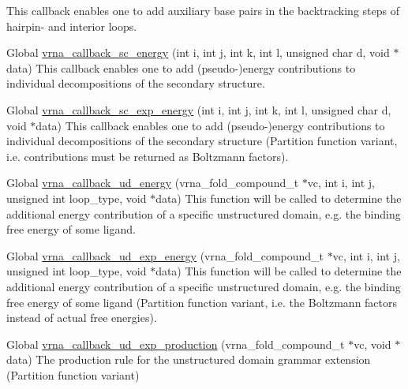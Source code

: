 \begin{DoxyRefList}
%
 This callback enables one to add auxiliary base pairs in the backtracking steps of hairpin-\/ and interior loops.  
\item[Global \mbox{\hyperlink{group__soft__constraints_ga88a266695d9e25cc12114dceb7b4565e}{vrna\+\_\+callback\+\_\+sc\+\_\+energy}} (int i, int j, int k, int l, unsigned char d, void $\ast$data)]\label{callbacks__callbacks000014}%
%
 This callback enables one to add (pseudo-\/)energy contributions to individual decompositions of the secondary structure.  
\item[Global \mbox{\hyperlink{group__soft__constraints_ga4099978d410513edeeff8f3db13144c5}{vrna\+\_\+callback\+\_\+sc\+\_\+exp\+\_\+energy}} (int i, int j, int k, int l, unsigned char d, void $\ast$data)]\label{callbacks__callbacks000015}%
%
 This callback enables one to add (pseudo-\/)energy contributions to individual decompositions of the secondary structure (Partition function variant, i.\+e. contributions must be returned as Boltzmann factors).  
\item[Global \mbox{\hyperlink{group__domains__up_ga75825c57d0bfde4ae4f95c044260c5c3}{vrna\+\_\+callback\+\_\+ud\+\_\+energy}} (vrna\+\_\+fold\+\_\+compound\+\_\+t $\ast$vc, int i, int j, unsigned int loop\+\_\+type, void $\ast$data)]\label{callbacks__callbacks000007}%
%
 This function will be called to determine the additional energy contribution of a specific unstructured domain, e.\+g. the binding free energy of some ligand.  
\item[Global \mbox{\hyperlink{group__domains__up_ga861706f257ba993753464b823e65b86e}{vrna\+\_\+callback\+\_\+ud\+\_\+exp\+\_\+energy}} (vrna\+\_\+fold\+\_\+compound\+\_\+t $\ast$vc, int i, int j, unsigned int loop\+\_\+type, void $\ast$data)]\label{callbacks__callbacks000008}%
%
 This function will be called to determine the additional energy contribution of a specific unstructured domain, e.\+g. the binding free energy of some ligand (Partition function variant, i.\+e. the Boltzmann factors instead of actual free energies).  
\item[Global \mbox{\hyperlink{group__domains__up_ga33d78327dcd04c1ca5ab2887edc18c7b}{vrna\+\_\+callback\+\_\+ud\+\_\+exp\+\_\+production}} (vrna\+\_\+fold\+\_\+compound\+\_\+t $\ast$vc, void $\ast$data)]\label{callbacks__callbacks000010}%
%
 The production rule for the unstructured domain grammar extension (Partition function variant)  

\end{DoxyRefList}
